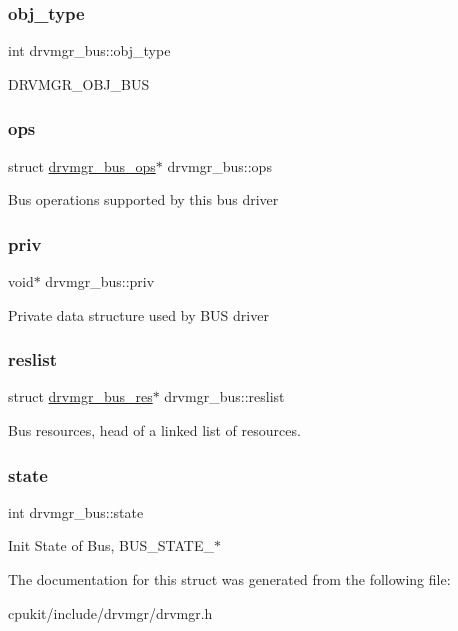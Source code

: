\subsubsection{\texorpdfstring{obj\_type}{obj\_type}}
{\footnotesize\ttfamily int drvmgr\+\_\+bus\+::obj\+\_\+type}

D\+R\+V\+M\+G\+R\+\_\+\+O\+B\+J\+\_\+\+B\+US \mbox{\label{structdrvmgr__bus_a992594c81fca463bb9b84f67979e8a9f}} 
\subsubsection{\texorpdfstring{ops}{ops}}
{\footnotesize\ttfamily struct \mbox{\hyperlink{structdrvmgr__bus__ops}{drvmgr\+\_\+bus\+\_\+ops}}$\ast$ drvmgr\+\_\+bus\+::ops}

Bus operations supported by this bus driver \mbox{\label{structdrvmgr__bus_a3e61e0a6e6b1fc336e34710482b1f38e}} 
\subsubsection{\texorpdfstring{priv}{priv}}
{\footnotesize\ttfamily void$\ast$ drvmgr\+\_\+bus\+::priv}

Private data structure used by B\+US driver \mbox{\label{structdrvmgr__bus_a75c599005800b34c8743d784b63543d9}} 
\subsubsection{\texorpdfstring{reslist}{reslist}}
{\footnotesize\ttfamily struct \mbox{\hyperlink{structdrvmgr__bus__res}{drvmgr\+\_\+bus\+\_\+res}}$\ast$ drvmgr\+\_\+bus\+::reslist}

Bus resources, head of a linked list of resources. \mbox{\label{structdrvmgr__bus_a1d32bbcc0a03fd1bdce9902125b1fec3}} 
\subsubsection{\texorpdfstring{state}{state}}
{\footnotesize\ttfamily int drvmgr\+\_\+bus\+::state}

Init State of Bus, B\+U\+S\+\_\+\+S\+T\+A\+T\+E\+\_\+$\ast$ 

The documentation for this struct was generated from the following file\+:\begin{DoxyCompactItemize}
\item 
cpukit/include/drvmgr/drvmgr.\+h\end{DoxyCompactItemize}
